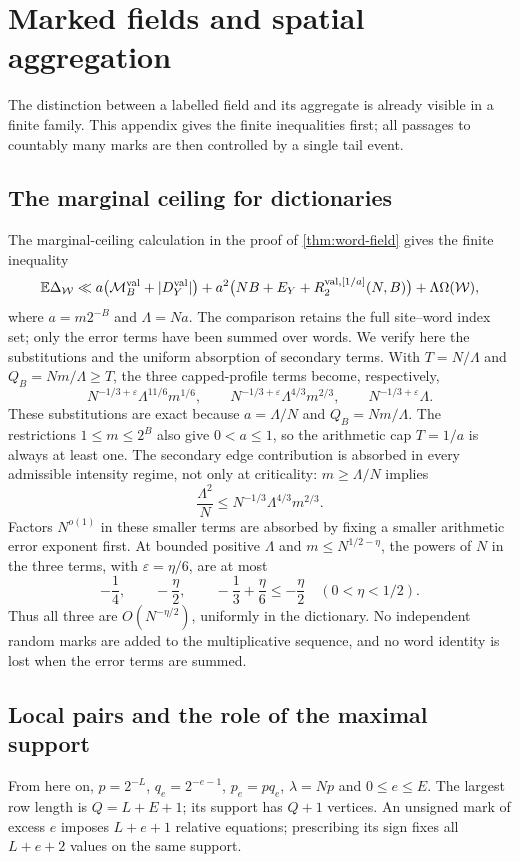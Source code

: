 \section{Marked fields and spatial aggregation}\label{supp:sec:fields}
The distinction between a labelled field and its aggregate is already visible
in a finite family. This appendix gives the finite inequalities first; all
passages to countably many marks are then controlled by a single tail event.

\subsection{The marginal ceiling for dictionaries}
The marginal-ceiling calculation in the proof of
\cref{thm:word-field} gives the finite inequality
\[
 \mathbb E\Delta_{\mathcal W}\ll
 a\bigl(\mathcal M_B^{\rm val}+|D_Y^{\rm val}|\bigr)
 +a^2\bigl(NB+E_Y+R_2^{\mathrm{val},[1/a]}(N,B)\bigr)
 +\Lambda\Omega(\mathcal W),
\]
where $a=m2^{-B}$ and $\Lambda=Na$.
The comparison retains the full site--word index set; only the error
terms have been summed over words. We verify here the substitutions
and the uniform absorption of secondary terms.
With $T=N/\Lambda$ and $Q_B=Nm/\Lambda\ge T$, the three capped-profile
terms become, respectively,
\[
 N^{-1/3+\varepsilon}\Lambda^{11/6}m^{1/6},\qquad
 N^{-1/3+\varepsilon}\Lambda^{4/3}m^{2/3},\qquad
 N^{-1/3+\varepsilon}\Lambda.
\]
These substitutions are exact because $a=\Lambda/N$ and
$Q_B=Nm/\Lambda$. The restrictions $1\le m\le2^B$ also give
$0<a\le1$, so the arithmetic cap $T=1/a$ is always at least one.
The secondary edge contribution is absorbed in every admissible
intensity regime, not only at criticality: $m\ge\Lambda/N$ implies
\[
 \frac{\Lambda^2}{N}
 \le N^{-1/3}\Lambda^{4/3}m^{2/3}.
\]
Factors $N^{o(1)}$ in these smaller terms are absorbed by fixing a
smaller arithmetic error exponent first.
At bounded positive $\Lambda$ and $m\le N^{1/2-\eta}$, the powers of
$N$ in the three terms, with $\varepsilon=\eta/6$, are at most
\[
 -\frac14,\qquad -\frac\eta2,\qquad
 -\frac13+\frac\eta6\le-\frac\eta2\quad(0<\eta<1/2).
\]
Thus all three are $O(N^{-\eta/2})$, uniformly in the dictionary. No independent random marks
are added to the multiplicative sequence, and no word identity is lost
when the error terms are summed.

\subsection{Local pairs and the role of the maximal support}\label{supp:sec:local-marks}
From here on, $p=2^{-L}$, $q_e=2^{-e-1}$, $p_e=pq_e$,
$\lambda=Np$ and $0\le e\le E$. The largest row length is
$Q=L+E+1$; its support has $Q+1$ vertices. An unsigned mark of excess $e$
imposes $L+e+1$ relative equations; prescribing its sign fixes all
$L+e+2$ values on the same support.

